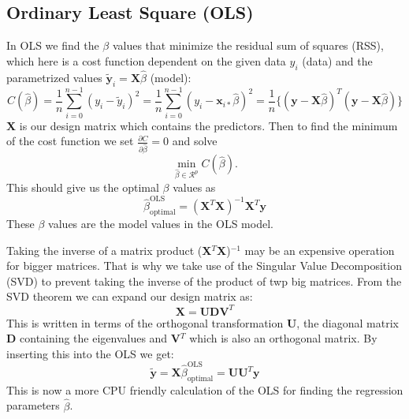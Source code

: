 \documentclass[12pt,a4paper,english]{article}
\begin{document}
\subsection{Ordinary Least Square (OLS)}
In OLS we find the $\beta$ values that minimize the residual sum of squares (RSS), which here is a cost function dependent on the given data $y_i$ (data) and the parametrized values $\tilde{\textbf{y}}_i=\textbf{X}\hat{\beta}$ (model):
\begin{equation}
\label{eq:cost_OLS}
C(\hat{\beta})=\frac{1}{n}\sum_{i=0}^{n-1}(y_i-\tilde{y}_i)^2=\frac{1}{n}\sum_{i=0}^{n-1}(y_i-\textbf{x}_{i*}\hat{\beta})^2=\frac{1}{n}\{(\textbf{y}-\textbf{X}\hat{\beta})^T(\textbf{y}-\textbf{X}\hat{\beta})\}
\end{equation} 
\textbf{X} is our design matrix which contains the predictors. Then to find the minimum of the cost function we set $\frac{\partial C}{\partial \hat{\beta}}=0$ and solve
\[\min_{\hat{\beta}\in \mathcal{R}^p}C(\hat{\beta}).\] This should give us the optimal $\beta$ values as
\begin{equation}
\label{eq:beta_OLS_opt}
\hat{\beta}_{\text{optimal}}^{\text{OLS}}=(\textbf{X}^T\textbf{X})^{-1}\textbf{X}^T\textbf{y}
\end{equation}
These $\beta$ values are the model values in the OLS model.

Taking the inverse of a matrix product (\textbf{X}$^T$\textbf{X})$^{-1}$ may be an expensive operation for bigger matrices. That is why we take use of the Singular Value Decomposition (SVD) to prevent taking the inverse of the product of twp big matrices. From the SVD theorem we can expand our design matrix as:
\[\textbf{X}=\textbf{U}\textbf{D}\textbf{V}^T\]
This is written in terms of the orthogonal transformation \textbf{U}, the diagonal matrix \textbf{D} containing the eigenvalues and \textbf{V}$^T$ which is also an orthogonal matrix. By inserting this into the OLS we get:
\begin{equation}
\label{eq:beta_SVD_OLS}
\tilde{\textbf{y}}=\textbf{X}\hat{\beta}_{\text{optimal}}^{\text{OLS}}=\textbf{U}\textbf{U}^T\textbf{y}
\end{equation}
This is now a more CPU friendly calculation of the OLS for finding the regression parameters $\hat{\beta}$.
\end{document}

